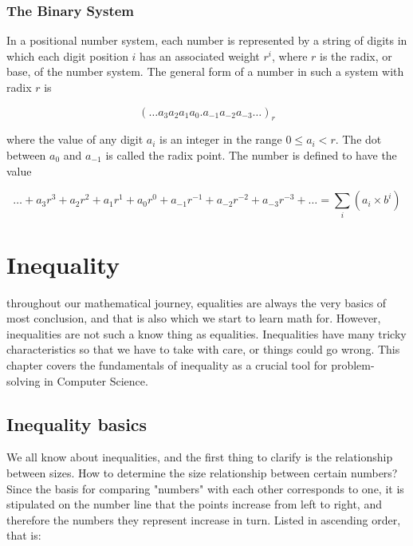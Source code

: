 \documentclass[
	12pt, %
	fleqn, %
	a4paper, %
]{LegrandOrangeBook}
\begin{document}
\subsection{The Binary System}
\begin{definition}
    In a positional number system, each number is represented by a string of digits in which each digit position \( i \) has an associated weight \( r^i \), where \( r \) is the radix, or base, of the number system. The general form of a number in such a system with radix \( r \) is

\[
(\ldots a_3a_2a_1a_0.a_{-1}a_{-2}a_{-3}\ldots)_r
\]

where the value of any digit \( a_i \) is an integer in the range \( 0 \leq a_i < r \). The dot between \( a_0 \) and \( a_{-1} \) is called the radix point. The number is defined to have the value

\[
\ldots + a_3r^3 + a_2r^2 + a_1r^1 + a_0r^0 + a_{-1}r^{-1} + a_{-2}r^{-2} + a_{-3}r^{-3} + \ldots = \sum_i (a_i \times b^i)
\]


\end{definition}



\chapterspaceabove{6.75cm} 
\chapterspacebelow{7.25cm} 
\chapter{Inequality}
throughout our mathematical journey, equalities are always the very basics of most conclusion, and that is also which we start to learn math for. However, inequalities are not such a know thing as equalities.
Inequalities have many tricky characteristics so that we have to take with care, or things could go wrong. This chapter covers the fundamentals of inequality as a crucial tool for problem-solving in Computer Science.

\section{Inequality basics}
We all know about inequalities, and the first thing to clarify is the relationship between sizes. How to determine the size relationship between certain numbers? Since the basis for comparing "numbers" with each other corresponds to one, it is stipulated on the number line that the points increase from left to right, and therefore the numbers they represent increase in turn. Listed in ascending order, that is:
\end{document}
